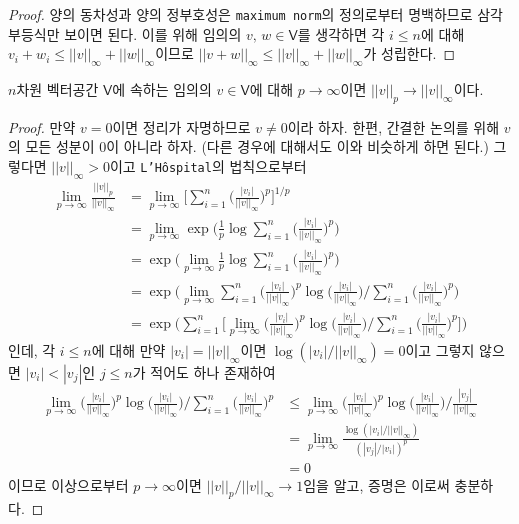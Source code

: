 \begin{proof}
    양의 동차성과 양의 정부호성은 \texttt{maximum norm}의 정의로부터 명백하므로 삼각부등식만 보이면 된다. 이를 위해 임의의 $v,\,w\in\mathsf{V}$를 생각하면 각 $i\leq n$에 대해 $v_i+w_i\leq||v||_\infty+||w||_\infty$이므로 $||v+w||_\infty\leq||v||_\infty+||w||_\infty$가 성립한다.
\end{proof}

\begin{theorem}
    $n$차원 벡터공간 $\mathsf{V}$에 속하는 임의의 $v\in\mathsf{V}$에 대해 $p\to\infty$이면 $||v||_p\to||v||_\infty$이다.
\end{theorem}

\begin{proof}
    만약 $v=0$이면 정리가 자명하므로 $v\ne0$이라 하자. 한편, 간결한 논의를 위해 $v$의 모든 성분이 $0$이 아니라 하자. (다른 경우에 대해서도 이와 비슷하게 하면 된다.) 그렇다면 $||v||_\infty>0$이고 \texttt{L'H\^ospital}의 법칙으로부터
    \begin{align*}
        \lim_{p\to\infty}\frac{||v||_p}{||v||_\infty}&=\lim_{p\to\infty}\bigg[\sum_{i=1}^n\bigg(\frac{|v_i|}{||v||_\infty}\bigg)^p\bigg]^{1/p}\\
        &=\lim_{p\to\infty}\exp\bigg(\frac{1}{p}\log\sum_{i=1}^n\bigg(\frac{|v_i|}{||v||_\infty}\bigg)^p\bigg)\\
        &=\exp\bigg(\lim_{p\to\infty}\frac{1}{p}\log\sum_{i=1}^n\bigg(\frac{|v_i|}{||v||_\infty}\bigg)^p\bigg)\\
        &=\exp\bigg(\lim_{p\to\infty}\sum_{i=1}^n\bigg(\frac{|v_i|}{||v||_\infty}\bigg)^p\log\bigg(\frac{|v_i|}{||v||_\infty}\bigg)\bigg/\sum_{i=1}^n\bigg(\frac{|v_i|}{||v||_\infty}\bigg)^p\bigg)\\
        &=\exp\bigg(\sum_{i=1}^n\bigg[\lim_{p\to\infty}\bigg(\frac{|v_i|}{||v||_\infty}\bigg)^p\log\bigg(\frac{|v_i|}{||v||_\infty}\bigg)\bigg/\sum_{i=1}^n\bigg(\frac{|v_i|}{||v||_\infty}\bigg)^p\bigg]\bigg)
    \end{align*}
    인데, 각 $i\leq n$에 대해 만약 $|v_i|=||v||_\infty$이면 $\log(|v_i|/||v||_\infty)=0$이고 그렇지 않으면 $|v_i|<|v_j|$인 $j\leq n$가 적어도 하나 존재하여
    \begin{align*}
        \lim_{p\to\infty}\bigg(\frac{|v_i|}{||v||_\infty}\bigg)^p\log\bigg(\frac{|v_i|}{||v||_\infty}\bigg)\bigg/\sum_{i=1}^n\bigg(\frac{|v_i|}{||v||_\infty}\bigg)^p&\leq\lim_{p\to\infty}\bigg(\frac{|v_i|}{||v||_\infty}\bigg)^p\log\bigg(\frac{|v_i|}{||v||_\infty}\bigg)\bigg/\frac{|v_j|}{||v||_\infty}\\
        &=\lim_{p\to\infty}\frac{\log(|v_i|/||v||_\infty)}{(|v_j|/|v_i|)^p}\\
        &=0
    \end{align*}
    이므로 이상으로부터 $p\to\infty$이면 $||v||_p/||v||_\infty\to1$임을 알고, 증명은 이로써 충분하다.
\end{proof}

